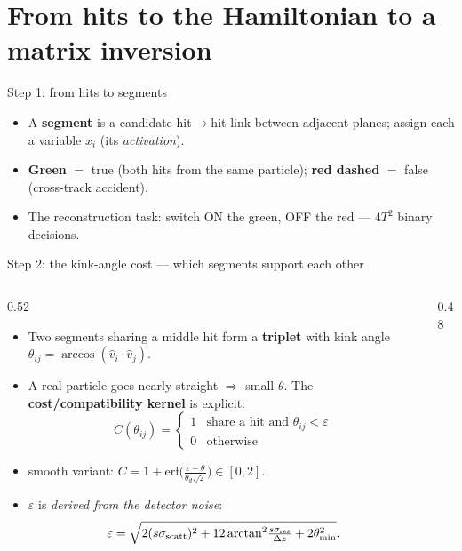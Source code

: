 \section{From hits to the Hamiltonian to a matrix inversion}
\begin{frame}{Step 1: from hits to segments}
  \centering
  \begin{itemize}
    \item A \textbf{segment} is a candidate hit$\to$hit link between adjacent planes; assign each a variable $x_i$ (its \emph{activation}).
    \item \textcolor{grn}{\textbf{Green}} $=$ true (both hits from the same particle); \textcolor{acc}{\textbf{red dashed}} $=$ false (cross-track accident).
    \item The reconstruction task: switch ON the green, OFF the red --- $4T^2$ binary decisions.
  \end{itemize}
\end{frame}

\begin{frame}{Step 2: the kink-angle cost --- which segments support each other}
  \begin{columns}[T]
    \begin{column}{0.52\textwidth}
      \begin{itemize}
        \item Two segments sharing a middle hit form a \textbf{triplet} with kink angle
        $\theta_{ij}=\arccos(\hat v_i\cdot\hat v_j)$.
        \item A real particle goes nearly straight $\Rightarrow$ small $\theta$. The \textbf{cost/compatibility kernel} is explicit:
        \[ C(\theta_{ij})=\begin{cases}1 & \text{share a hit and } \theta_{ij}<\varepsilon\\[2pt] 0 & \text{otherwise}\end{cases} \]
        \item smooth variant: $C=1+\mathrm{erf}\!\big(\tfrac{\varepsilon-\theta}{\theta_d\sqrt2}\big)\in[0,2]$.
        \item $\varepsilon$ is \emph{derived from the detector noise}:
        \[ \varepsilon=\sqrt{2(s\sigma_{\rm scatt})^2+12\arctan^2\!\tfrac{s\sigma_{\rm res}}{\Delta z}+2\theta_{\min}^2}. \]
      \end{itemize}
    \end{column}
    \begin{column}{0.48\textwidth}
      \centering{}
    \end{column}
  \end{columns}
\end{frame}

